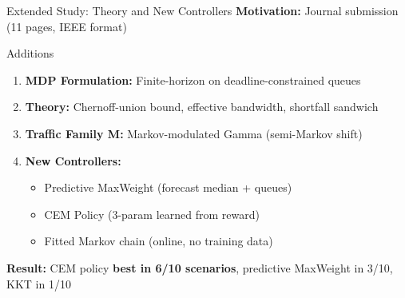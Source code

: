 \documentclass[aspectratio=169]{beamer}
\begin{document}
\begin{frame}{Extended Study: Theory and New Controllers}
\textbf{Motivation:} Journal submission (11 pages, IEEE format)

\begin{block}{Additions}
\begin{enumerate}
    \item \textbf{MDP Formulation:} Finite-horizon on deadline-constrained queues
    \item \textbf{Theory:} Chernoff-union bound, effective bandwidth, shortfall sandwich
    \item \textbf{Traffic Family M:} Markov-modulated Gamma (semi-Markov shift)
    \item \textbf{New Controllers:}
    \begin{itemize}
        \item Predictive MaxWeight (forecast median + queues)
        \item CEM Policy (3-param learned from reward)
        \item Fitted Markov chain (online, no training data)
    \end{itemize}
\end{enumerate}
\end{block}

\textbf{Result:} CEM policy \textbf{best in 6/10 scenarios}, predictive MaxWeight in 3/10, KKT in 1/10
\end{frame}
\end{document}
